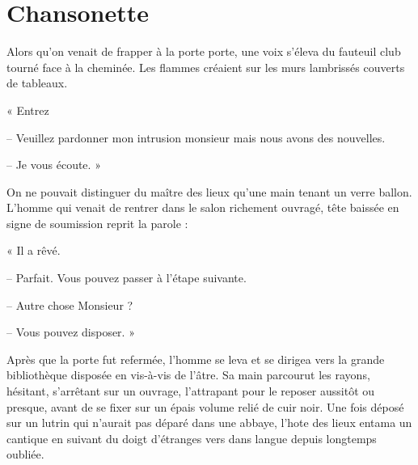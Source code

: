 \chapter[Chansonette]{Chansonette}
Alors qu'on venait de frapper à la porte porte, une voix s'éleva du fauteuil club tourné face à la cheminée. Les flammes 
créaient sur les murs lambrissés couverts de tableaux.

« Entrez

-- Veuillez pardonner mon intrusion monsieur mais nous avons des nouvelles.

-- Je vous écoute. »

On ne pouvait distinguer du maître des lieux qu'une main tenant un verre ballon. L'homme qui venait de rentrer dans le 
salon richement ouvragé, tête baissée en signe de soumission reprit la parole :

« Il a rêvé.

-- Parfait. Vous pouvez passer à l'étape suivante.

-- Autre chose Monsieur ?

-- Vous pouvez disposer. »

Après que la porte fut refermée, l'homme se leva et se dirigea vers la grande bibliothèque disposée en vis-à-vis de l'âtre. 
Sa main parcourut les rayons, hésitant, s'arrêtant sur un ouvrage, l'attrapant pour le reposer aussitôt ou presque, avant 
de se fixer sur un épais volume relié de cuir noir. Une fois déposé sur un lutrin qui n'aurait pas déparé dans une abbaye, 
l'hote des lieux entama un cantique en suivant du doigt d'étranges vers dans langue depuis longtemps oubliée.
